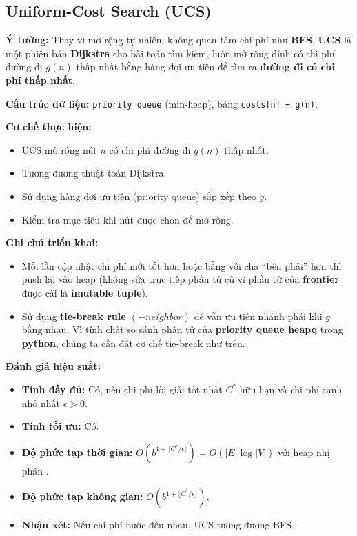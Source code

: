 \subsection{Uniform-Cost Search (UCS)}

\textbf{Ý tưởng:} \cite{russell2021} Thay vì mở rộng tự nhiên, không quan tâm chi phí như \textbf{BFS}, \textbf{UCS} là một phiên bản \textbf{Dijkstra} cho bài toán tìm kiếm, luôn mở rộng đỉnh có chi phí đường đi $g(n)$ thấp nhất bằng hàng đợi ưu tiên để tìm ra \textbf{đường đi có chi phí thấp nhất}.

\textbf{Cấu trúc dữ liệu:} \texttt{priority queue} (min-heap), bảng \texttt{costs[n] = g(n)}.

\textbf{Cơ chế thực hiện:}
\begin{itemize}
    \item UCS mở rộng nút $n$ có chi phí đường đi $g(n)$ thấp nhất.
    \item Tương đương thuật toán Dijkstra.
    \item Sử dụng hàng đợi ưu tiên (priority queue) sắp xếp theo $g$.
    \item Kiểm tra mục tiêu khi nút được chọn để mở rộng.

\end{itemize}

\textbf{Ghi chú triển khai:} 
\begin{itemize}
    \item Mỗi lần cập nhật chi phí mới tốt hơn hoặc bằng với cha “bên phải” hơn thì push lại vào heap (không sửa trực tiếp phần tử cũ vì phần tử của \textbf{frontier} được cài là \textbf{imutable tuple}).
    \item Sử dụng \textbf{tie-break rule $(-neighbor)$} để vẫn ưu tiên nhánh phải khi $g$ bằng nhau. Vì tính chất so sánh phần tử của \textbf{priority queue heapq} trong \textbf{python}, chúng ta cần đặt cơ chế tie-break như trên.
\end{itemize}

\textbf{Đánh giá hiệu suất:} \cite{russell2021}
\begin{itemize}
    \item \textbf{Tính đầy đủ:} Có, nếu chi phí lời giải tốt nhất $C^*$ hữu hạn và chi phí cạnh nhỏ nhất $\epsilon > 0$.
    \item \textbf{Tính tối ưu:} Có.
    \item \textbf{Độ phức tạp thời gian:} $O(b^{1+\lfloor C^*/\epsilon \rfloor}) = O(|E| \log |V|)$ với heap nhị phân .
    \item \textbf{Độ phức tạp không gian:} $O(b^{1+\lfloor C^*/\epsilon \rfloor})$.
    \item \textbf{Nhận xét:} Nếu chi phí bước đều nhau, UCS tương đương BFS.
\end{itemize}

